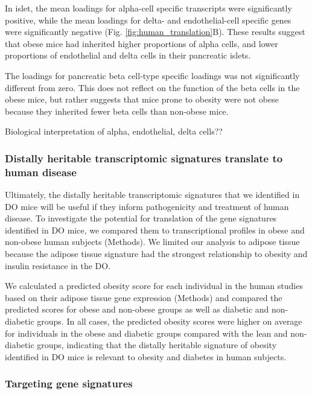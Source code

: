 \documentclass[
]{article}
\begin{document}
In islet, the mean loadings for alpha-cell specific transcripts were
significantly positive, while the mean loadings for delta- and
endothelial-cell specific genes were significantly negative (Fig.
\ref{fig:human_translation}B). These results suggest that obese mice had
inherited higher proportions of alpha cells, and lower proportions of
endothelial and delta cells in their pancreatic islets.

The loadings for pancreatic beta cell-type specific loadings was not
significantly different from zero. This does not reflect on the function
of the beta cells in the obese mice, but rather suggests that mice prone
to obesity were not obese because they inherited fewer beta cells than
non-obese mice.

Biological interpretation of alpha, endothelial, delta cells??

\subsubsection{Distally heritable transcriptomic signatures translate to
human
disease}\label{distally-heritable-transcriptomic-signatures-translate-to-human-disease}

Ultimately, the distally heritable transcriptomic signatures that we
identified in DO mice will be useful if they inform pathogenicity and
treatment of human disease. To investigate the potential for translation
of the gene signatures identified in DO mice, we compared them to
transcriptional profiles in obese and non-obese human subjects
(Methods). We limited our analysis to adipose tissue because the adipose
tissue signature had the strongest relationship to obesity and insulin
resistance in the DO.

We calculated a predicted obesity score for each individual in the human
studies based on their adipose tissue gene expression (Methods) and
compared the predicted scores for obese and non-obese groups as well as
diabetic and non-diabetic groups. In all cases, the predicted obesity
scores were higher on average for individuals in the obese and diabetic
groups compared with the lean and non-diabetic groups, indicating that
the distally heritable signature of obesity identified in DO mice is
relevant to obesity and diabetes in human subjects.

\subsubsection{Targeting gene
signatures}\label{targeting-gene-signatures}
\end{document}
